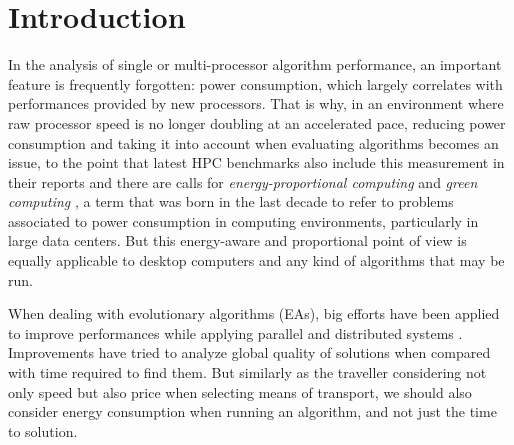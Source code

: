 \section{Introduction}


In the analysis of single or multi-processor algorithm performance, an
important feature 
is frequently forgotten:  power consumption, which largely correlates
with performances provided by new processors. That is why, in an
environment where raw processor speed is no longer doubling at an
accelerated pace, reducing power consumption and taking it into
account when evaluating algorithms becomes an issue, to the point that
latest HPC benchmarks also include this measurement in their reports
and there are calls for {\em energy-proportional computing}
\cite{energyaware} and 
\textit{green computing} \cite{green-computing}, a term that was born in the last decade to refer
to problems associated to power consumption in computing environments,
particularly in large data centers. But this
energy-aware and proportional point of view is equally applicable to desktop computers
and any kind of algorithms that may be run. 

When dealing with evolutionary algorithms (EAs), big efforts have been
applied to improve performances while applying parallel and
distributed systems \cite{paba}.  Improvements have tried to analyze
global quality of solutions when compared with time required to find
them.   
But similarly as the traveller considering not only speed but also
price when selecting means of transport, we should also consider
energy consumption when running an algorithm, and not just the time to
solution.  %

